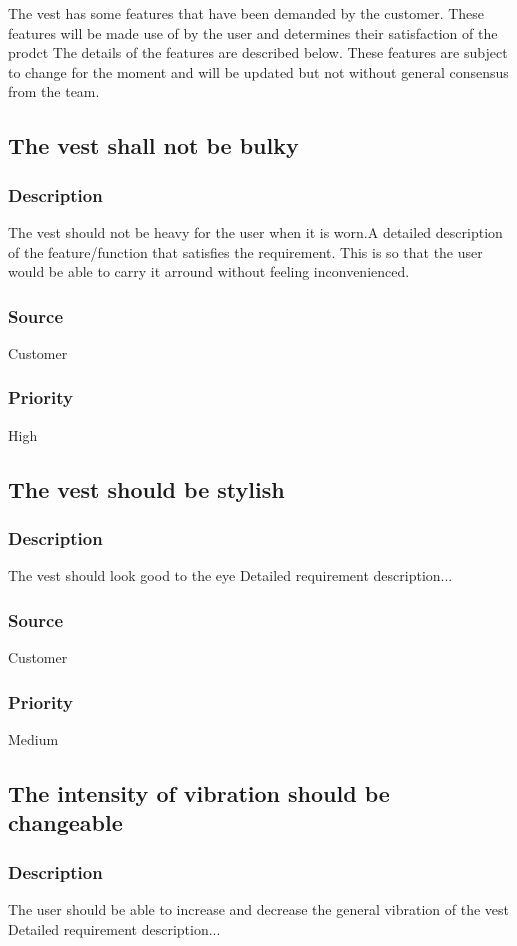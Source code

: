 The vest has some features that have been demanded by the customer. These features will be made use of by the user and determines their satisfaction of the prodct  The details of the features are described below. These features are subject to change for the moment and will be updated but not without general consensus from the team.
\subsection{The vest shall not be bulky}
\subsubsection{Description}
The vest should not be heavy for the user when it is worn.A detailed description of the feature/function that satisfies the requirement. This is so that the user would be able to carry it arround without feeling  inconvenienced.
\subsubsection{Source}
Customer 
\subsubsection{Priority}
High

\subsection{The vest should be stylish}
\subsubsection{Description}
The vest should look good to the eye
Detailed requirement description...
\subsubsection{Source}
Customer
\subsubsection{Priority}
Medium

\subsection{The intensity of vibration should be changeable }
\subsubsection{Description}
The user should be able to increase and decrease the general vibration of the vest
Detailed requirement description...
